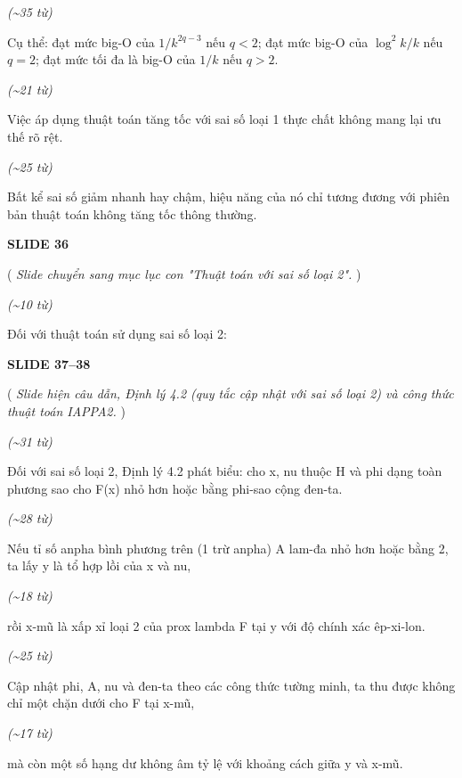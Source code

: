 ﻿\documentclass[12pt]{article}
\newcommand{\scene}[1]{
    \vspace{18pt}
    \normalsize
    \noindent\textbf{\MakeUppercase{#1}}
    \vspace{12pt}
}
\newcommand{\action}[1]{
    \vspace{6pt}
    \small
    \noindent(\textit{#1})
    \vspace{6pt}
}
\newenvironment{speech}{
    \normalsize
    \begin{list}{}{
        \leftmargin=1.25in
        \rightmargin=1.25in
        \parsep=0pt
        \topsep=0pt
        \partopsep=0pt
    }
    \item[]
}{
    \end{list}
    \vspace{6pt}
}
\newcommand{\block}[1]{
    \vspace{4pt}
    \noindent\hspace{1.5in}\textit{(\textasciitilde #1 từ)}
}
\begin{document}
\block{35}
\begin{speech}
    Cụ thể: đạt mức big-O của $1/k^{2q-3}$ nếu $q < 2$; đạt mức big-O của $\log^2 k / k$ nếu $q = 2$; đạt mức tối đa là big-O của $1/k$ nếu $q > 2$.
\end{speech}

\block{21}
\begin{speech}
    Việc áp dụng thuật toán tăng tốc với sai số loại 1 thực chất không mang lại ưu thế rõ rệt.
\end{speech}

\block{25}
\begin{speech}
    Bất kể sai số giảm nhanh hay chậm, hiệu năng của nó chỉ tương đương với phiên bản thuật toán không tăng tốc thông thường.
\end{speech}

\scene{SLIDE 36}

\action{
    Slide chuyển sang mục lục con "Thuật toán với sai số loại 2".
}

\block{10}
\begin{speech}
    Đối với thuật toán sử dụng sai số loại 2:
\end{speech}

\scene{SLIDE 37--38}

\action{
    Slide hiện câu dẫn, Định lý 4.2 (quy tắc cập nhật với sai số loại 2) và công thức thuật toán IAPPA2.
}

\block{31}
\begin{speech}
    Đối với sai số loại 2, Định lý 4.2 phát biểu: cho x, nu thuộc H và phi dạng toàn phương sao cho F(x) nhỏ hơn hoặc bằng phi-sao cộng đen-ta.
\end{speech}

\block{28}
\begin{speech}
    Nếu tỉ số anpha bình phương trên (1 trừ anpha) A lam-đa nhỏ hơn hoặc bằng 2, ta lấy y là tổ hợp lồi của x và nu,
\end{speech}

\block{18}
\begin{speech}
    rồi x-mũ là xấp xỉ loại 2 của prox lambda F tại y với độ chính xác êp-xi-lon.
\end{speech}

\block{25}
\begin{speech}
    Cập nhật phi, A, nu và đen-ta theo các công thức tường minh, ta thu được không chỉ một chặn dưới cho F tại x-mũ,
\end{speech}

\block{17}
\begin{speech}
    mà còn một số hạng dư không âm tỷ lệ với khoảng cách giữa y và x-mũ.
\end{speech}
\end{document}
